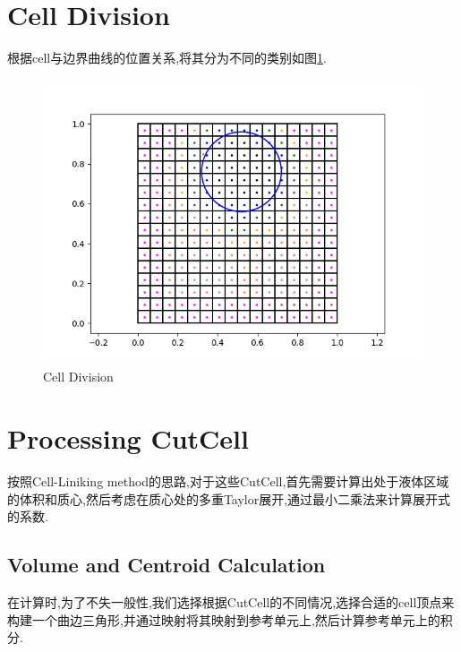 \documentclass[12pt,halfline,a4paper]{ouparticle}
\begin{document}
\section{Cell Division}
根据cell与边界曲线的位置关系,将其分为不同的类别如图\ref{fig:cell_division}.
\begin{figure}[h]
    \centering
    \includegraphics{figure/cycle.png}
    \caption{Cell Division}
    \label{fig:cell_division}
\end{figure}

\section{Processing CutCell}
按照Cell-Liniking method\cite{celllinking,stateredistribution}的思路,对于这些CutCell,首先需要计算出处于液体区域的体积和质心,然后考虑在质心处的多重Taylor展开,通过最小二乘法来计算展开式的系数\cite{fourthorder}.


\subsection{Volume and Centroid Calculation}
在计算时,为了不失一般性,我们选择根据CutCell的不同情况,选择合适的cell顶点来构建一个曲边三角形\cite{NEFEM},并通过映射将其映射到参考单元上,然后计算参考单元上的积分.
\end{document}
